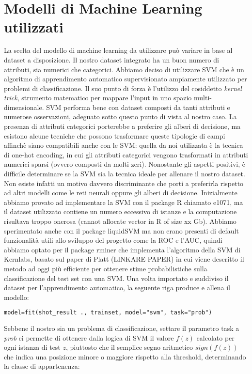 \section{Modelli di Machine Learning utilizzati}



La scelta del modello di machine learning da utilizzare può variare in base al dataset a disposizione. Il nostro dataset integrato ha un buon numero di attributi, sia numerici che categorici.
Abbiamo deciso di utilizzare SVM che è un algoritmo di apprendimento automatico supervisionato ampiamente utilizzato per problemi di classificazione. Il suo punto di forza è l'utilizzo del cosiddetto \textit{kernel trick}, strumento matematico per mappare l'input in uno spazio multi-dimensionale. SVM performa bene con dataset composti da tanti attributi e numerose osservazioni, adeguato sotto questo punto di vista al nostro caso.
La presenza di attributi categorici porterebbe a preferire gli alberi di decisione, ma esistono alcune tecniche che possono trasformare queste tipologie di campi affinchè siano compatibili anche con le SVM: quella da noi utilizzata è la tecnica di one-hot encoding, in cui gli attributi categorici vengono trasformati in attributi numerici sparsi (ovvero composti da molti zeri).
Nonostante gli aspetti positivi, è difficile determinare se la SVM sia la tecnica ideale per allenare il nostro dataset. Non esiste infatti un motivo davvero discriminante che porti a preferirla rispetto ad altri modelli come le reti neurali oppure gli alberi di decisione.
Inizialmente abbiamo provato ad implementare la SVM con il package R chiamato e1071, ma il dataset utilizzato contiene un numero eccessivo di istanze e la computazione risultava troppo onerosa (cannot allocate vector in R of size xx Gb). Abbiamo sperimentato anche con il package liquidSVM ma non erano presenti di default funzionalità utili allo sviluppo del progetto come la ROC e l'AUC, quindi abbiamo optato per il package rminer che implementa l’algoritmo della SVM di Kernlabs, basato sul paper di Platt (LINKARE PAPER) in cui viene descritto il metodo ad oggi più efficiente per ottenere stime probabilistiche sulla classificazione del test set con una SVM.
Una volta importato e suddiviso il dataset per l’apprendimento automatico, la seguente riga produce e allena il modello:

\texttt{model=fit(shot_result~., trainset, model="svm", task="prob")}

Sebbene il nostro sia un problema di classificazione, settare il parametro task a \textit{prob} ci permette di ottenere dalla logica di SVM il valore $ f(z) $ calcolato per ogni istanza di test $z$, piuttosto che il semplice segno aritmetico $sign(f(z))$ che indica una posizione minore o maggiore rispetto alla threshold, determinando la classe di appartenenza:

